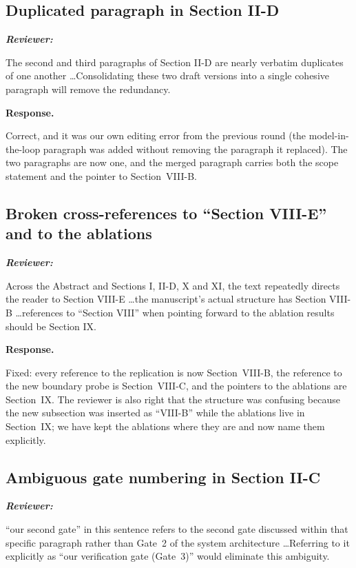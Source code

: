 \documentclass[11pt,a4paper]{article}
\newenvironment{reviewer}{\par\medskip\noindent\begin{minipage}{\linewidth}\small\itshape\color{quote}\textbf{Reviewer:}\par}{\end{minipage}\medskip\par}
\newenvironment{response}{\par\noindent\begin{minipage}{\linewidth}\small\textbf{Response.}\par}{\end{minipage}\medskip\par}
\begin{document}
\subsection{Duplicated paragraph in Section II-D}

\begin{reviewer}
The second and third paragraphs of Section II-D are nearly verbatim
duplicates of one another \dots Consolidating these two draft versions into
a single cohesive paragraph will remove the redundancy.
\end{reviewer}

\begin{response}
Correct, and it was our own editing error from the previous round (the
model-in-the-loop paragraph was added without removing the paragraph it
replaced). The two paragraphs are now one, and the merged paragraph
carries both the scope statement and the pointer to Section~VIII-B.
\end{response}

\subsection{Broken cross-references to ``Section VIII-E'' and to the ablations}

\begin{reviewer}
Across the Abstract and Sections I, II-D, X and XI, the text repeatedly
directs the reader to Section VIII-E \dots the manuscript's actual
structure has Section VIII-B \dots references to ``Section VIII'' when
pointing forward to the ablation results should be Section IX.
\end{reviewer}

\begin{response}
Fixed: every reference to the replication is now Section~VIII-B, the
reference to the new boundary probe is Section~VIII-C, and the pointers to
the ablations are Section~IX. The reviewer is also right that the
structure was confusing because the new subsection was inserted as
``VIII-B'' while the ablations live in Section~IX; we have kept the
ablations where they are and now name them explicitly.
\end{response}

\subsection{Ambiguous gate numbering in Section II-C}

\begin{reviewer}
``our second gate'' in this sentence refers to the second gate discussed
within that specific paragraph rather than Gate~2 of the system
architecture \dots Referring to it explicitly as ``our verification gate
(Gate~3)'' would eliminate this ambiguity.
\end{reviewer}
\end{document}
